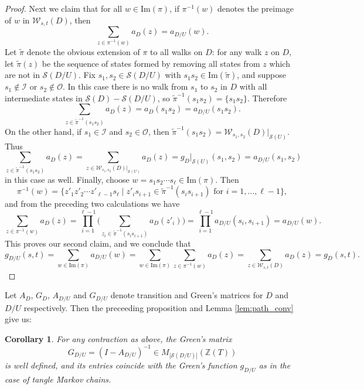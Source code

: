 \documentclass[11pt,hyp,]{nyjm}
\newcommand{\Z}{\mathbb{Z}}
\numberwithin{thm}{section}
\newtheorem{cor}[thm]{Corollary}
\theoremstyle{definition}
\theoremstyle{remark}
\begin{document}
\begin{proof}
		Next we claim that for all $w \in \text{Im}(\pi)$, if $\pi^{-1}(w)$ denotes the preimage of $w$ in $\mathcal{W}_{s,t}(D)$, then
		$$
		\sum_{z \in \pi^{-1}(w)} a_D(z) = a_{D/U}(w).
		$$
		Let $\tilde{\pi}$ denote the obvious extension of $\pi$ to all walks on $D$: for any walk $z$ on $D$, let $\tilde{\pi}(z)$ be the sequence of states formed by removing all states from $z$ which are not in $\mathcal{S}(D/U)$. Fix $s_1, s_2 \in \mathcal{S}(D/U)$ with $s_1s_2 \in \text{Im}(\tilde{\pi})$, and suppose $s_1 \notin \mathcal{I}$ or $s_2 \notin \mathcal{O}$. In this case there is no walk from $s_1$ to $s_2$ in $D$ with all intermediate states in $\mathcal{S}(D) - \mathcal{S}(D/U)$, so $\tilde{\pi}^{-1}(s_1s_2) = \{s_1s_2\}$. Therefore
		$$
		\sum_{z \in \tilde{\pi}^{-1}(s_1s_2)} a_D(z) = a_D(s_1s_2) = a_{D/U}(s_1s_2).
		$$
		On the other hand, if $s_1 \in \mathcal{I}$ and $s_2 \in \mathcal{O}$, then $\tilde{\pi}^{-1}(s_1s_2) = \mathcal{W}_{s_1,s_2}(D)|_{\mathcal{S}(U)}$. Thus
		$$
		\sum_{z \in \tilde{\pi}^{-1}(s_1s_2)} a_D(z) = \sum_{z \in  \mathcal{W}_{s_1,s_2}(D)|_{\mathcal{S}(U)}} a_D(z) = g_D|_{\mathcal{S}(U)}(s_1,s_2) = a_{D/U}(s_1,s_2)
		$$
		in this case as well. Finally, choose $w = s_1s_2 \cdots s_\ell \in \text{Im}(\pi)$. Then
		$$
		\pi^{-1}(w) = \{z'_1 z'_2 \cdots z'_{\ell - 1}s_\ell  \mid z'_is_{i + 1} \in \tilde{\pi}^{-1}(s_is_{i + 1}) \text{ for $i = 1, \dots, \ell - 1$}\},
		$$
		and from the preceding two calculations we have
		$$
		\sum_{z \in \pi^{-1}(w)} a_D(z) = \prod_{i = 1}^{\ell - 1}\Big( \sum_{z_i \in \tilde{\pi}^{-1}(s_is_{i + 1})} a_D(z'_i) \Big) = \prod_{i = 1}^{\ell - 1} a_{D/U}(s_i,s_{i + 1}) = a_{D/U}(w).
		$$
		This proves our second claim, and we conclude that
		$$
		g_{D/U}(s,t) = \sum_{w \in \text{Im}(\pi)} a_{D/U}(w) = \sum_{w \in \text{Im}(\pi)} \sum_{z \in \pi^{-1}(w)} a_D(z) = \sum_{z \in \mathcal{W}_{s,t}(D)} a_D(z) = g_D(s,t).
		$$
	\end{proof}

	Let $A_D$, $G_D$, $A_{D/U}$ and $G_{D/U}$ denote transition and Green's matrices for $D$ and $D/U$ respectively. Then the preceeding proposition and Lemma \ref{lem:path_conv} give us:
	
	\begin{cor}
		\label{cor:g_matrix}
		For any contraction as above, the Green's matrix
		$$
		G_{D/U} = (I - A_{D/U})^{-1} \in M_{|\mathcal{S}(D/U)|}(\Z(T))
		$$
		is well defined, and its entries coincide with the Green's function $g_{D/U}$ as in the case of tangle Markov chains.
	\end{cor}
	
\end{document}

